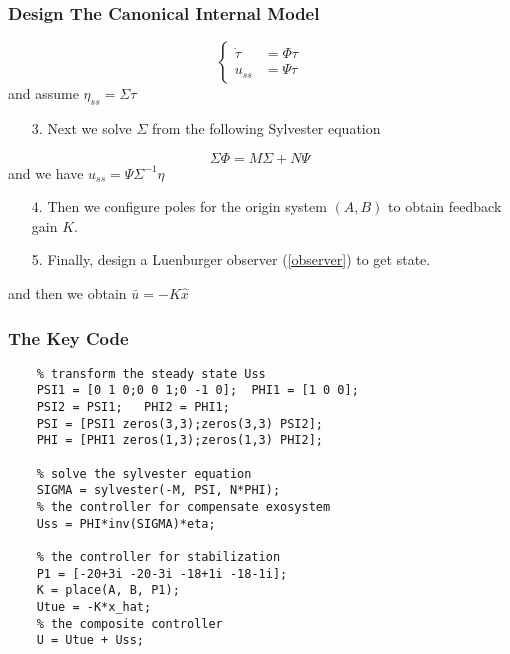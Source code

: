 \documentclass{beamer}
\begin{document}
\begin{frame}[fragile]
    \frametitle{{\color{red} Design The Canonical Internal Model}}
    \begin{equation}\label{exosystem}\left\{
      \begin{aligned}
        \dot{\tau} &= \Phi \tau \\
        u_{ss} &= \Psi \tau
      \end{aligned}\right.
    \end{equation}
and assume $\eta_{ss} = \Sigma \tau$
    \begin{enumerate}
      \item [3.] {\color{blue}Next we solve $\Sigma$ from the following Sylvester equation}
    \end{enumerate}
    \begin{equation}\label{sylvester}
      \Sigma \Phi = M\Sigma + N\Psi
    \end{equation}
    and we have $u_{ss}=\Psi \Sigma^{-1}\eta$

    \begin{enumerate}
      \item [4.] {\color{blue}Then we configure poles for the origin system $(A,B)$ to obtain feedback gain $K$.}
    \end{enumerate}

    \begin{enumerate}
      \item [5.] {\color{blue}Finally, design a Luenburger observer (\ref{observer}) to get state.}
    \end{enumerate}
    and then we obtain $\bar{u}=-K \hat{x}$
\end{frame}


\begin{frame}[fragile]
    \frametitle{{\color{red} The Key Code}}
    \begin{lstlisting}
    % transform the steady state Uss
    PSI1 = [0 1 0;0 0 1;0 -1 0];  PHI1 = [1 0 0];
    PSI2 = PSI1;   PHI2 = PHI1;
    PSI = [PSI1 zeros(3,3);zeros(3,3) PSI2];
    PHI = [PHI1 zeros(1,3);zeros(1,3) PHI2];
    
    % solve the sylvester equation
    SIGMA = sylvester(-M, PSI, N*PHI);
    % the controller for compensate exosystem
    Uss = PHI*inv(SIGMA)*eta;

    % the controller for stabilization
    P1 = [-20+3i -20-3i -18+1i -18-1i];
    K = place(A, B, P1);
    Utue = -K*x_hat;
    % the composite controller
    U = Utue + Uss;
    \end{lstlisting}
\end{frame}
\end{document}
